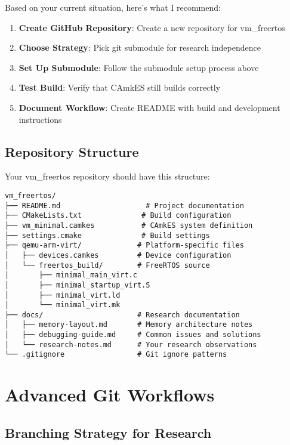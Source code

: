 \documentclass[11pt,a4paper]{article}
\begin{document}
Based on your current situation, here's what I recommend:

\begin{enumerate}
\item \textbf{Create GitHub Repository}: Create a new repository for vm\_freertos
\item \textbf{Choose Strategy}: Pick git submodule for research independence
\item \textbf{Set Up Submodule}: Follow the submodule setup process above
\item \textbf{Test Build}: Verify that CAmkES still builds correctly
\item \textbf{Document Workflow}: Create README with build and development instructions
\end{enumerate}

\subsection{Repository Structure}

Your vm\_freertos repository should have this structure:

\begin{lstlisting}[caption=Recommended Repository Structure]
vm_freertos/
├── README.md                    # Project documentation
├── CMakeLists.txt              # Build configuration  
├── vm_minimal.camkes           # CAmkES system definition
├── settings.cmake              # Build settings
├── qemu-arm-virt/             # Platform-specific files
│   ├── devices.camkes         # Device configuration
│   └── freertos_build/        # FreeRTOS source
│       ├── minimal_main_virt.c
│       ├── minimal_startup_virt.S
│       ├── minimal_virt.ld
│       └── minimal_virt.mk
├── docs/                      # Research documentation
│   ├── memory-layout.md       # Memory architecture notes
│   ├── debugging-guide.md     # Common issues and solutions
│   └── research-notes.md      # Your research observations
└── .gitignore                 # Git ignore patterns
\end{lstlisting}

\section{Advanced Git Workflows}

\subsection{Branching Strategy for Research}
\end{document}
